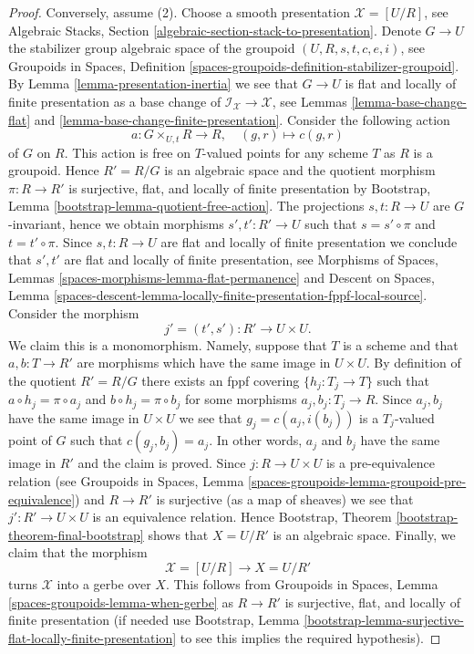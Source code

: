 \documentclass{stacks-project}
\theoremstyle{plain}
\theoremstyle{definition}
\theoremstyle{remark}
\numberwithin{equation}{subsection}
\begin{document}
\begin{proof}
\medskip\noindent
Conversely, assume (2). Choose a smooth presentation $\mathcal{X} = [U/R]$, see
Algebraic Stacks, Section \ref{algebraic-section-stack-to-presentation}.
Denote $G \to U$ the stabilizer group algebraic space of the groupoid
$(U, R, s, t, c, e, i)$, see
Groupoids in Spaces, Definition
\ref{spaces-groupoids-definition-stabilizer-groupoid}.
By
Lemma \ref{lemma-presentation-inertia}
we see that $G \to U$ is flat and locally of finite presentation as
a base change of $\mathcal{I}_\mathcal{X} \to \mathcal{X}$, see
Lemmas \ref{lemma-base-change-flat} and
\ref{lemma-base-change-finite-presentation}.
Consider the following action
$$
a : G \times_{U, t} R \to R, \quad (g, r) \mapsto c(g, r)
$$
of $G$ on $R$. This action is free on $T$-valued points for any
scheme $T$ as $R$ is a groupoid. Hence $R' = R/G$ is an algebraic
space and the quotient morphism $\pi : R \to R'$ is surjective,
flat, and locally of finite presentation by
Bootstrap, Lemma \ref{bootstrap-lemma-quotient-free-action}.
The projections $s, t : R \to U$ are $G$-invariant, hence
we obtain morphisms $s' , t' : R' \to U$ such that $s = s' \circ \pi$
and $t = t' \circ \pi$.
Since $s, t : R \to U$ are flat and locally of finite presentation
we conclude that $s', t'$ are flat and locally of finite presentation, see
Morphisms of Spaces, Lemmas
\ref{spaces-morphisms-lemma-flat-permanence} and
Descent on Spaces, Lemma
\ref{spaces-descent-lemma-locally-finite-presentation-fppf-local-source}.
Consider the morphism
$$
j' = (t', s') : R' \longrightarrow U \times U.
$$
We claim this is a monomorphism. Namely, suppose that $T$ is a scheme
and that $a, b : T \to R'$ are morphisms which have the same image
in $U \times U$. By definition of the quotient $R' = R/G$ there
exists an fppf covering $\{h_j : T_j \to T\}$ such
that $a \circ h_j = \pi \circ a_j$ and $b \circ h_j = \pi \circ b_j$
for some morphisms $a_j, b_j : T_j \to R$. Since $a_j, b_j$ have the same
image in $U \times U$ we see that $g_j = c(a_j, i(b_j))$ is a $T_j$-valued
point of $G$ such that $c(g_j, b_j) = a_j$. In other words, $a_j$ and
$b_j$ have the same image in $R'$ and the claim is proved.
Since $j : R \to U \times U$ is a pre-equivalence relation (see
Groupoids in Spaces, Lemma
\ref{spaces-groupoids-lemma-groupoid-pre-equivalence})
and $R \to R'$ is surjective (as a map of sheaves) we see that
$j' : R' \to U \times U$ is an equivalence relation.
Hence
Bootstrap, Theorem \ref{bootstrap-theorem-final-bootstrap}
shows that $X = U/R'$ is an algebraic space.
Finally, we claim that the morphism
$$
\mathcal{X} = [U/R] \longrightarrow X = U/R'
$$
turns $\mathcal{X}$ into a gerbe over $X$. This follows from
Groupoids in Spaces, Lemma \ref{spaces-groupoids-lemma-when-gerbe}
as $R \to R'$ is surjective, flat, and locally of finite presentation
(if needed use
Bootstrap, Lemma
\ref{bootstrap-lemma-surjective-flat-locally-finite-presentation}
to see this implies the required hypothesis).
\end{proof}
\end{document}
